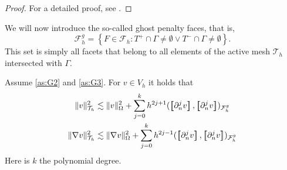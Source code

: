 \begin{proof}
    For a detailed proof, see \cite{gurkan2019stabilized}.
\end{proof}

We will now introduce the so-called ghost penalty faces, that is, \[
\mathcal{F} ^{g}_{h} = \left\{ F\in \mathcal{F} _{h} : T^{+}\cap \Gamma \neq \emptyset  \vee T^{-}\cap \Gamma \neq \emptyset  \right\}.
\]
This set is simply all facets that belong to all elements of the active mesh $\mathcal{T} _{h}$  intersected with $\Gamma $.

\begin{lemma}
    \label{lemma:inv_gh_lemma}
    Assume \ref{as:G2} and \ref{as:G3}.
    For $v \in  V_{h}$ it holds that
        \begin{align}
            \label{eq:inv_gh_1}
        \| v \|_{ \mathcal{T} _{h} }^{ 2 }  & \lesssim  \| v \|_{ \Omega  }^{ 2 }  + \sum_{j=0}^{k} h^{2j+1} ( \jump{ \partial ^{j}_{n} v }, \jump{ \partial ^{j}_{n} v}    )_{\mathcal{F}_{h}^{g}}\\
            \label{eq:inv_gh_2}
        \| \nabla v \|_{ \mathcal{T} _{h} }^{ 2 }  & \lesssim  \| \nabla v \|_{ \Omega  }^{ 2 }  + \sum_{j=0}^{k} h^{2j-1} ( \jump{ \partial ^{j}_{n} v }, \jump{ \partial ^{j}_{n}v }    )_{\mathcal{F}_{h}^{g}}
        \end{align}
        Here is $k$ the polynomial degree.
\end{lemma}

